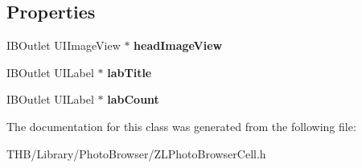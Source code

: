 \subsection*{Properties}
\begin{DoxyCompactItemize}
\item 
\mbox{\label{interface_z_l_photo_browser_cell_a4d004f2046f133963bc5e6319a3a52b4}} 
I\+B\+Outlet U\+I\+Image\+View $\ast$ {\bfseries head\+Image\+View}
\item 
\mbox{\label{interface_z_l_photo_browser_cell_a145f4ff61c6da2eb0ec4fd119ad8b25d}} 
I\+B\+Outlet U\+I\+Label $\ast$ {\bfseries lab\+Title}
\item 
\mbox{\label{interface_z_l_photo_browser_cell_ab543055b5adbe6c9f93cafd1f88fddc2}} 
I\+B\+Outlet U\+I\+Label $\ast$ {\bfseries lab\+Count}
\end{DoxyCompactItemize}


The documentation for this class was generated from the following file\+:\begin{DoxyCompactItemize}
\item 
T\+H\+B/\+Library/\+Photo\+Browser/Z\+L\+Photo\+Browser\+Cell.\+h\end{DoxyCompactItemize}
